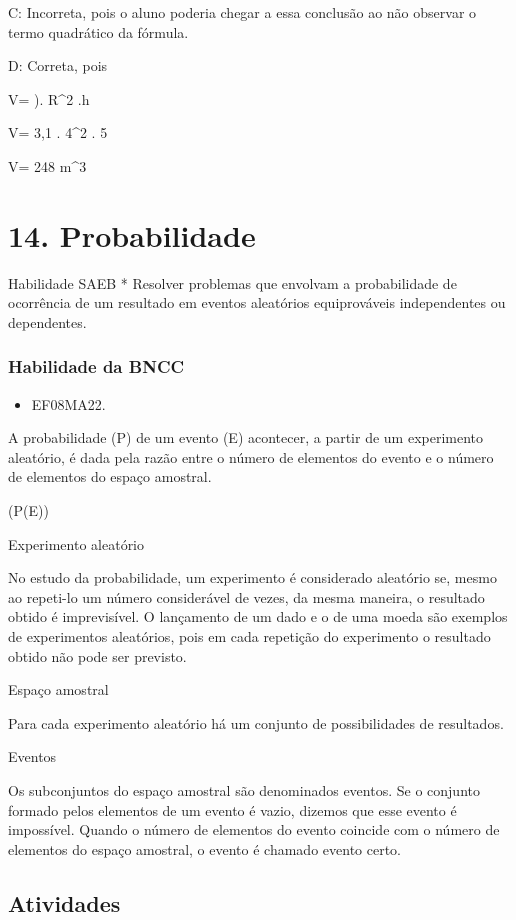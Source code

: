 {C: Incorreta, pois o aluno poderia chegar a essa conclusão ao não
observar o termo quadrático da fórmula.

D: Correta, pois

V= \Pi). R^2 .h

V= 3,1 . 4^2 . 5

V= 248 m^3


\chapter{14. Probabilidade}

Habilidade SAEB * Resolver problemas que envolvam a probabilidade de
ocorrência de um resultado em eventos aleatórios equiprováveis
independentes ou dependentes.

\subsection{Habilidade da BNCC}

\begin{itemize}
  \item EF08MA22.
\end{itemize}

A probabilidade (P) de um evento (E) acontecer, a partir de um
experimento aleatório, é dada pela razão entre o número de elementos do
evento e o número de elementos do espaço amostral.

(P(E))

Experimento aleatório

No estudo da probabilidade, um experimento é considerado aleatório se,
mesmo ao repeti-lo um número considerável de vezes, da mesma maneira, o
resultado obtido é imprevisível. O lançamento de um dado e o de uma
moeda são exemplos de experimentos aleatórios, pois em cada repetição do
experimento o resultado obtido não pode ser previsto.

Espaço amostral

Para cada experimento aleatório há um conjunto de possibilidades de
resultados.

Eventos

Os subconjuntos do espaço amostral são denominados eventos. Se o
conjunto formado pelos elementos de um evento é vazio, dizemos que esse
evento é impossível. Quando o número de elementos do evento coincide com
o número de elementos do espaço amostral, o evento é chamado evento
certo.

\section{Atividades}

}
